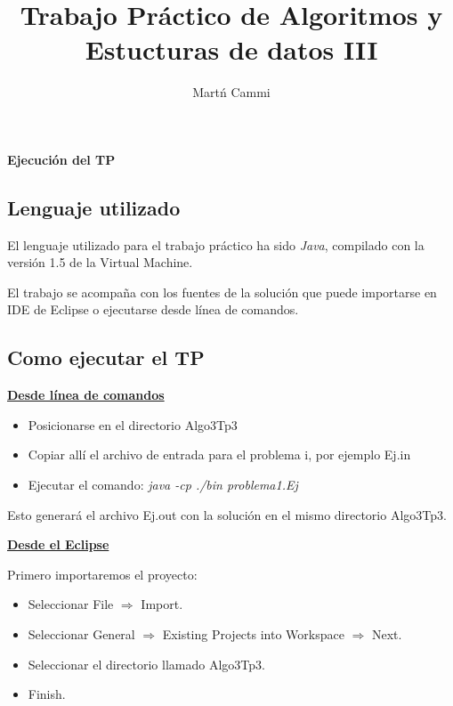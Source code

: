 \documentclass[11pt, a4paper, spanish]{article}
\author{Mart\'n Cammi}
\title{Trabajo Pr\'actico de Algoritmos y Estucturas de datos III}
\begin{document}

\maketitle

\thispagestyle{empty}

\tableofcontents

\newpage


\textbf{Ejecuci\'on del TP}
\label{sec:ejecucion}

	\subsection{Lenguaje utilizado}
		
		El lenguaje utilizado para el trabajo pr\'actico ha sido \emph{Java}, compilado con la versi\'on 1.5 de la Virtual Machine.
		
		El trabajo se acompa\~{n}a con los fuentes de la soluci\'on que puede importarse en IDE de Eclipse o ejecutarse desde l\'inea de comandos.

	\subsection{Como ejecutar el TP}
	
	\textbf{\underline{Desde l\'inea de comandos}}
	\begin{itemize}
			\item{Posicionarse en el directorio Algo3Tp3}
			\item{Copiar all\'i el archivo de entrada para el problema i, por ejemplo Ej.in}
			\item{Ejecutar el comando: \emph{java -cp ./bin problema1.Ej}}
	\end{itemize}
	Esto generar\'a el archivo Ej.out con la soluci\'on en el mismo directorio Algo3Tp3.

	\textbf{\underline{Desde el Eclipse}}
	
	Primero importaremos el proyecto:	
	
	\begin{itemize}
			\item{Seleccionar File $\Rightarrow$ Import.}
			\item{Seleccionar General $\Rightarrow$ Existing Projects into Workspace $\Rightarrow$ Next.}
			\item{Seleccionar el directorio llamado Algo3Tp3.}
			\item{Finish.}
	\end{itemize}
	
\end{document}
